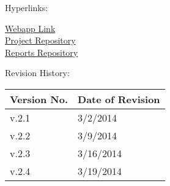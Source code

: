 {

Hyperlinks:\\
\begin{center}
\href{http://192.241.248.91}{Webapp Link}\\
\href{https://github.com/dkarivalis/SEP_SMIFL}{Project Repository}\\
\href{https://github.com/dkarivalis/SEP_SMIFL_reports}{Reports Repository}\\
\end{center}

Revision History:
\begin{longtable}{|p{1.6in}|p{2.6in}|}
\hline
{\large\color{color1}Version No.}&{\large \color{color1}Date of Revision}\\\hline
v.2.1&3/2/2014  \\ \hline
v.2.2&3/9/2014  \\ \hline
v.2.3&3/16/2014  \\ \hline
v.2.4&3/19/2014  \\ \hline
\end{longtable}

\vspace{20mm}\

}

